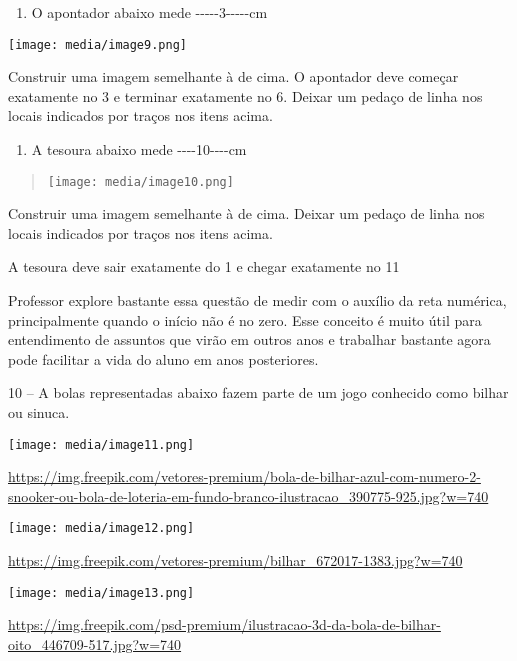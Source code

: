 \begin{enumerate}
\def\labelenumi{\alph{enumi})}
\item
  O apontador abaixo mede -\/-\/-\/-\/-3-\/-\/-\/-\/-cm
\end{enumerate}

\texttt{[image: media/image9.png]}

Construir uma imagem semelhante à de cima. O apontador deve começar
exatamente no 3 e terminar exatamente no 6. Deixar um pedaço de linha
nos locais indicados por traços nos itens acima.

\begin{enumerate}
\def\labelenumi{\alph{enumi})}
\item
  A tesoura abaixo mede -\/-\/-\/-10-\/-\/-\/-cm
\end{enumerate}

\begin{quote}
\texttt{[image: media/image10.png]}
\end{quote}

Construir uma imagem semelhante à de cima. Deixar um pedaço de linha nos
locais indicados por traços nos itens acima.

A tesoura deve sair exatamente do 1 e chegar exatamente no 11

Professor explore bastante essa questão de medir com o auxílio da reta
numérica, principalmente quando o início não é no zero. Esse conceito é
muito útil para entendimento de assuntos que virão em outros anos e
trabalhar bastante agora pode facilitar a vida do aluno em anos
posteriores.

10 -- A bolas representadas abaixo fazem parte de um jogo conhecido como
bilhar ou sinuca.

\texttt{[image: media/image11.png]}

\url{https://img.freepik.com/vetores-premium/bola-de-bilhar-azul-com-numero-2-snooker-ou-bola-de-loteria-em-fundo-branco-ilustracao_390775-925.jpg?w=740}

\texttt{[image: media/image12.png]}

\url{https://img.freepik.com/vetores-premium/bilhar_672017-1383.jpg?w=740}

\texttt{[image: media/image13.png]}

\url{https://img.freepik.com/psd-premium/ilustracao-3d-da-bola-de-bilhar-oito_446709-517.jpg?w=740}

